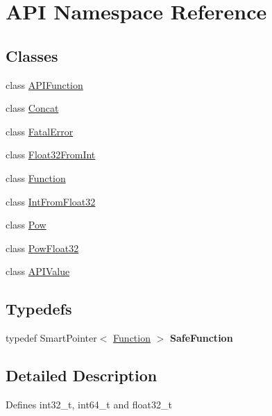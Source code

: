 \hypertarget{namespace_a_p_i}{\section{A\-P\-I Namespace Reference}
\label{namespace_a_p_i}
}
\subsection*{Classes}
\begin{DoxyCompactItemize}
\item 
class \hyperlink{class_a_p_i_1_1_a_p_i_function}{A\-P\-I\-Function}
\item 
class \hyperlink{class_a_p_i_1_1_concat}{Concat}
\item 
class \hyperlink{class_a_p_i_1_1_fatal_error}{Fatal\-Error}
\item 
class \hyperlink{class_a_p_i_1_1_float32_from_int}{Float32\-From\-Int}
\item 
class \hyperlink{class_a_p_i_1_1_function}{Function}
\item 
class \hyperlink{class_a_p_i_1_1_int_from_float32}{Int\-From\-Float32}
\item 
class \hyperlink{class_a_p_i_1_1_pow}{Pow}
\item 
class \hyperlink{class_a_p_i_1_1_pow_float32}{Pow\-Float32}
\item 
class \hyperlink{class_a_p_i_1_1_a_p_i_value}{A\-P\-I\-Value}
\end{DoxyCompactItemize}
\subsection*{Typedefs}
\begin{DoxyCompactItemize}
\item 
\hypertarget{namespace_a_p_i_a45cf1fb9660efbbc53fb7634b0cbd25f}{typedef Smart\-Pointer$<$ \hyperlink{class_a_p_i_1_1_function}{Function} $>$ {\bfseries Safe\-Function}}\label{namespace_a_p_i_a45cf1fb9660efbbc53fb7634b0cbd25f}

\end{DoxyCompactItemize}


\subsection{Detailed Description}
Defines int32\-\_\-t, int64\-\_\-t and float32\-\_\-t 